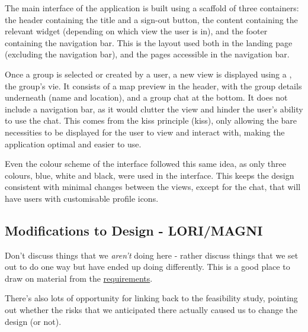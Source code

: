\documentclass{article}
\begin{document}
    The main interface of the application is built using a scaffold of three containers: the header containing the title and a sign-out button, the content containing the relevant widget (depending on which view the user is in), and the footer containing the navigation bar. This is the layout used both in the landing page (excluding the navigation bar), and the pages accessible in the navigation bar. \par
    
    Once a group is selected or created by a user, a new view is displayed using a , the group's vie. It consists of a map preview in the header, with the group details underneath (name and location), and a group chat at the bottom. It does not include a navigation bar, as it would clutter the view and hinder the user's ability to use the chat. This comes from the \acrshort{kiss} principle (\acrlong{kiss}), only allowing the bare necessities to be displayed for the user to view and interact with, making the application optimal and easier to use.\par
    
    Even the colour scheme of the interface followed this same idea, as only three colours, blue, white and black, were used in the interface. This keeps the design consistent with minimal changes between the views, except for the chat, that will have users with customisable profile icons. 
    
    
    
    \subsection{Modifications to Design - LORI/MAGNI}
    \label{subsec:modificationstodesign}
    Don't discuss things that we \emph{aren't} doing here - rather discuss things that we set out to do one way but have ended up doing differently. This is a good place to draw on material from the \hyperlink{sec:requirements}{requirements}. \par
    There's also lots of opportunity for linking back to the feasibility study, pointing out whether the risks that we anticipated there actually caused us to change the design (or not). \par
\end{document}

